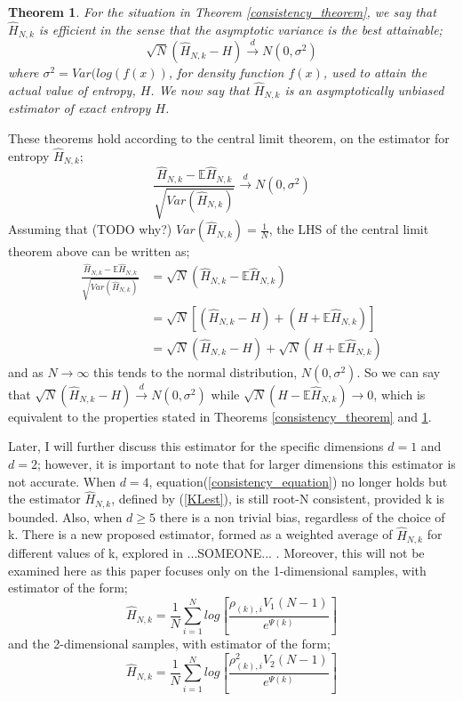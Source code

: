\documentclass{article}
\newtheorem{theorem}{Theorem}
\begin{document}
\begin{theorem} \label{asymptotic_theorem}
For the situation in Theorem \ref{consistency_theorem}, we say that $\hat{H}_{N, k}$ is efficient in the sense that the asymptotic variance is the best attainable;
\begin{equation} \label{asymptotic_equation}
\sqrt{N}(\hat{H}_{N, k} - H) \xrightarrow{d} N(0, \sigma^2)
\end{equation}
where $\sigma^2 = Var(log(f(x))$, for density function $f(x)$, used to attain the actual value of entropy, $H$. We now say that $\hat{H}_{N, k}$ is an asymptotically unbiased estimator of exact entropy $H$.
\end{theorem}

These theorems hold according to the central limit theorem, on the estimator for entropy $\hat{H}_{N, k}$;
\begin{equation}
\frac{\hat{H}_{N, k} - \mathbb{E}{\hat{H}_{N, k}}}{\sqrt{Var(\hat{H}_{N, k})}} \xrightarrow{d} N(0, \sigma^2) \nonumber
\end{equation}
Assuming that (TODO why?) $Var(\hat{H}_{N, k}) = \frac{1}{N}$, the LHS of the central limit theorem above can be written as;
\begin{align*}
\frac{\hat{H}_{N, k} - \mathbb{E}{\hat{H}_{N, k}}}{\sqrt{Var(\hat{H}_{N, k})}} &= \sqrt{N}(\hat{H}_{N, k} - \mathbb{E}{\hat{H}_{N, k}}) \\
&= \sqrt{N}[(\hat{H}_{N, k} - H) + (H + \mathbb{E}{\hat{H}_{N, k}})] \\
&= \sqrt{N}(\hat{H}_{N, k} - H) + \sqrt{N}(H + \mathbb{E}{\hat{H}_{N, k}})
\end{align*}
and as $N \to \infty$ this tends to the normal distribution, $N(0, \sigma^2)$. So we can say that $\sqrt{N}(\hat{H}_{N, k} - H) \xrightarrow{d} N(0, \sigma^2)$ while $\sqrt{N} (H - \mathbb{E}{\hat{H}_{N, k}}) \to 0$, which is equivalent to the properties stated in Theorems \ref{consistency_theorem} and \ref{asymptotic_theorem}.

Later, I will further discuss this estimator for the specific dimensions $d=1$ and $d=2$; however, it is important to note that for larger dimensions this estimator is not accurate. When $d=4$, equation(\ref{consistency_equation}) no longer holds but the estimator $\hat{H}_{N, k}$, defined by (\ref{KLest}), is still root-N consistent, provided k is bounded. Also, when $d \geq 5$ there is a non trivial bias, regardless of the choice of k. There is a new proposed estimator, formed as a weighted average of $\hat{H}_{N, k}$ for different values of k, explored in ...SOMEONE... . Moreover, this will not be examined here as this paper focuses only on the 1-dimensional samples, with estimator of the form;
\begin{equation} \nonumber
\hat{H}_{N, k} = \frac{1}{N} \sum_{i=1}^{N} log \left[ \frac{\rho_{(k),i} V_{1} (N-1)}{e^{\Psi(k)}} \right]
\end{equation}
and the 2-dimensional samples, with estimator of the form;
\begin{equation} \nonumber
\hat{H}_{N, k} = \frac{1}{N} \sum_{i=1}^{N} log \left[ \frac{\rho_{(k),i}^{2} V_{2} (N-1)}{e^{\Psi(k)}} \right]
\end{equation}
\end{document}
